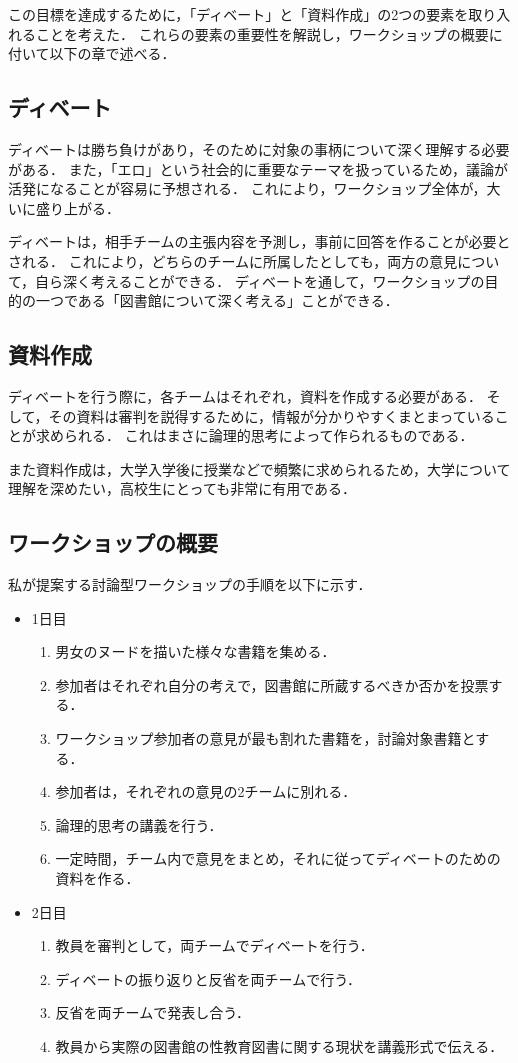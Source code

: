 \documentclass[uplatex,a4paper]{jsarticle}
\begin{document}
この目標を達成するために，「ディベート」と「資料作成」の2つの要素を取り入れることを考えた．
これらの要素の重要性を解説し，ワークショップの概要に付いて以下の章で述べる．

\subsection{ディベート}
ディベートは勝ち負けがあり，そのために対象の事柄について深く理解する必要がある．
また，「エロ」という社会的に重要なテーマを扱っているため，議論が活発になることが容易に予想される．
これにより，ワークショップ全体が，大いに盛り上がる．

ディベートは，相手チームの主張内容を予測し，事前に回答を作ることが必要とされる．
これにより，どちらのチームに所属したとしても，両方の意見について，自ら深く考えることができる．
ディベートを通して，ワークショップの目的の一つである「図書館について深く考える」ことができる．

\subsection{資料作成}
ディベートを行う際に，各チームはそれぞれ，資料を作成する必要がある．
そして，その資料は審判を説得するために，情報が分かりやすくまとまっていることが求められる．
これはまさに論理的思考によって作られるものである．

また資料作成は，大学入学後に授業などで頻繁に求められるため，大学について理解を深めたい，高校生にとっても非常に有用である．

\subsection{ワークショップの概要}
私が提案する討論型ワークショップの手順を以下に示す．
\begin{itemize}
    \item 1日目
    \begin{enumerate}
        \item 男女のヌードを描いた様々な書籍を集める．
        \item 参加者はそれぞれ自分の考えで，図書館に所蔵するべきか否かを投票する．
        \item ワークショップ参加者の意見が最も割れた書籍を，討論対象書籍とする．
        \item 参加者は，それぞれの意見の2チームに別れる．
        \item 論理的思考の講義を行う．
        \item 一定時間，チーム内で意見をまとめ，それに従ってディベートのための資料を作る．
    \end{enumerate}
    \item 2日目
    \begin{enumerate}
        \item 教員を審判として，両チームでディベートを行う．
        \item ディベートの振り返りと反省を両チームで行う．
        \item 反省を両チームで発表し合う．
        \item 教員から実際の図書館の性教育図書に関する現状を講義形式で伝える．
    \end{enumerate}
\end{itemize}
\end{document}
